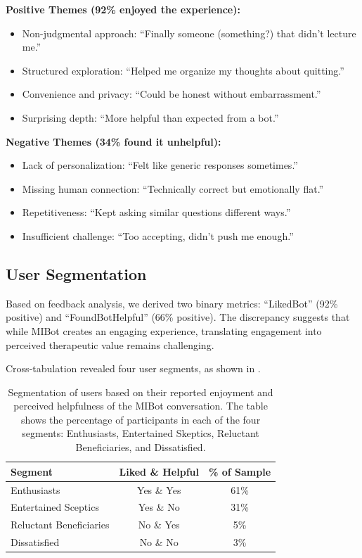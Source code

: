 \textbf{Positive Themes (92\% enjoyed the experience):}
\begin{itemize}
	\item Non-judgmental approach: ``Finally someone (something?) that didn't lecture me.''
	\item Structured exploration: ``Helped me organize my thoughts about quitting.''
	\item Convenience and privacy: ``Could be honest without embarrassment.''
	\item Surprising depth: ``More helpful than expected from a bot.''
\end{itemize}

\textbf{Negative Themes (34\% found it unhelpful):}
\begin{itemize}
	\item Lack of personalization: ``Felt like generic responses sometimes.''
	\item Missing human connection: ``Technically correct but emotionally flat.''
	\item Repetitiveness: ``Kept asking similar questions different ways.''
	\item Insufficient challenge: ``Too accepting, didn't push me enough.''
\end{itemize}

\subsection*{User Segmentation}

Based on feedback analysis, we derived two binary metrics: ``LikedBot'' (92\% positive) and ``FoundBotHelpful'' (66\% positive). The discrepancy suggests that while MIBot creates an engaging experience, translating engagement into perceived therapeutic value remains challenging.

Cross-tabulation revealed four user segments, as shown in .

\begin{table}[ht]
	\centering
	\small
	\setlength{\tabcolsep}{4pt}
	\renewcommand{\arraystretch}{1.1}
	\begin{tabular}{@{}lcc@{}}
		\toprule
		\textbf{Segment}        & \textbf{Liked \& Helpful} & \textbf{\% of Sample} \\
		\midrule
		Enthusiasts             & Yes \& Yes                & 61\%                  \\
		Entertained Sceptics    & Yes \& No                 & 31\%                  \\
		Reluctant Beneficiaries & No \& Yes                 & 5\%                   \\
		Dissatisfied            & No \& No                  & 3\%                   \\
		\bottomrule
	\end{tabular}
	\caption[Segmentation of MIBot Participants based on their Experiences]{Segmentation of users based on their reported enjoyment and perceived helpfulness of the MIBot conversation. The table shows the percentage of participants in each of the four segments: Enthusiasts, Entertained Skeptics, Reluctant Beneficiaries, and Dissatisfied.}
	\label{table:user_segments}
\end{table}

